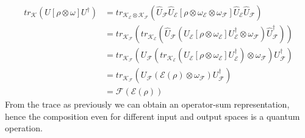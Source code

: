 \documentclass[a4paper,12pt]{article}
\begin{document}
\begin{align*}
tr_\mathcal{K}(U[\rho\otimes\omega]U^\dagger)&=
tr_{\mathcal{K}_\mathcal{E}\otimes\mathcal{K}_\mathcal{F}}
(\hat{U}_\mathcal{F}\hat{U}_\mathcal{E}[\rho\otimes\omega_\mathcal{E}\otimes\omega_\mathcal{F}]
\hat{U}_\mathcal{E}\hat{U}_\mathcal{F})\\ 
&=tr_{\mathcal{K}_\mathcal{F}}(tr_{\mathcal{K}_\mathcal{E}}(\hat{U}_\mathcal{F}
(U_\mathcal{E}[\rho\otimes\omega_\mathcal{E}]U_\mathcal{E}^\dagger\otimes\omega_\mathcal{F})\hat{U}_\mathcal{F}^\dagger))\\
&= tr_{\mathcal{K}_\mathcal{F}}(U_\mathcal{F}(tr_{\mathcal{K}_\mathcal{E}}
(U_\mathcal{E}[\rho\otimes\omega_\mathcal{E}]U_\mathcal{E}^\dagger)\otimes\omega_\mathcal{F})U_\mathcal{F}^\dagger)\\
&= tr_{\mathcal{K}_\mathcal{F}}(U_\mathcal{F}(\mathcal{E}(\rho)
\otimes\omega_\mathcal{F})U_\mathcal{F}^\dagger)\\
&=\mathcal{F}(\mathcal{E}(\rho))
\end{align*}
From the trace as previously we can obtain an operator-sum representation, hence
the composition even for different input and output spaces is a quantum operation.
\end{document}
